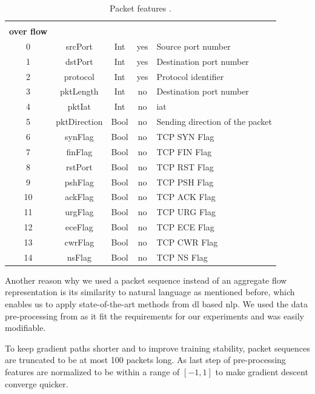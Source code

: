 \begin{table}[H]
	\centering
	\begin{tabular}{c c c c l}
		\thead{\textbf{\#}} & \thead{\textbf{Name}} & \thead{\textbf{Type}} & \thead{\textbf{Constant} \\ \textbf{over flow}} & \thead{\textbf{Description}} \\ \hline \midrule
		0 & srcPort & Int & yes & Source port number \\ \midrule
		1 & dstPort & Int & yes & Destination port number \\ \midrule
		2 & protocol & Int & yes & Protocol identifier \\ \midrule
		3 & pktLength & Int & no & Destination port number \\ \midrule
		4 & pktIat & Int & no & \gls{iat} \\ \midrule
		5 & pktDirection & Bool & no & Sending direction of the packet \\ \midrule
		6 & synFlag & Bool & no & TCP SYN Flag \\ \midrule
		7 & finFlag & Bool & no & TCP FIN Flag \\ \midrule
		8 & rstPort & Bool & no & TCP RST Flag \\ \midrule
		9 & pshFlag & Bool & no & TCP PSH Flag \\ \midrule
		10 & ackFlag & Bool & no & TCP ACK Flag \\ \midrule
		11 & urgFlag & Bool & no & TCP URG Flag \\ \midrule
		12 & eceFlag & Bool & no & TCP ECE Flag \\ \midrule
		13 & cwrFlag & Bool & no & TCP CWR Flag \\ \midrule
		14 & nsFlag & Bool & no & TCP NS Flag \\ \midrule
	\end{tabular}
	\caption{Packet features \cite{cic_ids_2017_analysis}.}
	\label{table:methodology:data_representation:features}
\end{table}

Another reason why we used a packet sequence instead of an aggregate flow representation is its similarity to natural language as mentioned before, which enables us to apply state-of-the-art methods from \gls{dl} based \gls{nlp}. We used the data pre-processing from \cite{adversarial_recurrent_ids} as it fit the requirements for our experiments and was easily modifiable.

To keep gradient paths shorter and to improve training stability, packet sequences are truncated to be at most 100 packets long. As last step of pre-processing features are normalized to be within a range of $[-1,1]$ to make gradient descent converge quicker.

